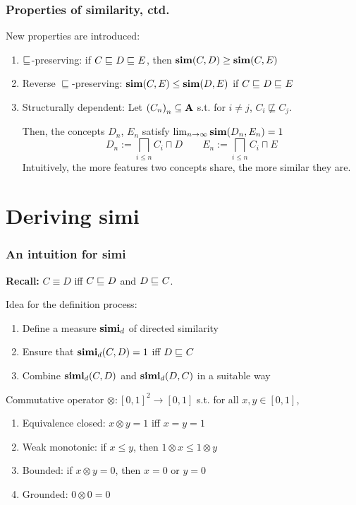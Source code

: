 \documentclass[smaller, dvipsnames]{beamer}
\newcounter{simprop}
\newcommand{\propplay}{\setcounter{enumi}{\thesimprop}}
\begin{document}
\begin{frame}
  \frametitle{Properties of similarity, ctd.}
  New properties are introduced:
  \begin{enumerate}[<+->]
    \propplay
    \item \alert{\(\sqsubseteq_{\mathcal{}}\)-preserving}: if \(C \sqsubseteq_{\mathcal{}} D \sqsubseteq_{\mathcal{}} E\),
    then \(\operatorname{\mathbf{sim}}(C,D) \ge \operatorname{\mathbf{sim}}(C,E)\)
    \item \alert{Reverse \(\sqsubseteq\)-preserving}: 
    \(\operatorname{\mathbf{sim}}(C,E) \le \operatorname{\mathbf{sim}}(D,E)\) if
    \(C \sqsubseteq_{\mathcal{}} D \sqsubseteq_{\mathcal{}} E\)
    \item \alert{Structurally dependent}: 
    Let \({(C_n)}_n \subseteq \mathbf{A}\) s.t. for \(i \ne j\),
    \(C_i \not\sqsubseteq C_j\).
    
    Then, the concepts
    \(D_n\), \(E_n\) satisfy
    \(\lim_{n \to \infty} \operatorname{\mathbf{sim}}(D_n,E_n) = 1\)
    \begin{equation*}
      D_n := \bigsqcap_{i \le n} C_i \sqcap D \qquad
      E_n := \bigsqcap_{i \le n} C_i \sqcap E
    \end{equation*}
    Intuitively, the more \alert{features}
    two concepts share, the more similar they are.
  \end{enumerate}
\end{frame}

\section{Deriving simi}

\begin{frame}
  \frametitle{An intuition for simi}
  \textbf{Recall:} \(C \equiv D\) iff \(C \sqsubseteq_{\mathcal{}} D\) and \(D \sqsubseteq_{\mathcal{}} C\).

  \onslide<+->  
  \alert{Idea} for the definition process:
  \begin{enumerate}[<+->]
    \item Define a measure \(\operatorname{\mathbf{simi}}_d\) of \alert{directed similarity}
    \item Ensure that \(\operatorname{\mathbf{simi}}_d(C,D) = 1\) iff \(D \sqsubseteq_{\mathcal{}} C\)
    \item Combine \(\operatorname{\mathbf{simi}}_d(C,D)\) and \(\operatorname{\mathbf{simi}}_d(D,C)\) in a suitable way
  \end{enumerate}
  \onslide<+->
  \begin{definition}
    Commutative operator
    \(\otimes \colon%
    {[0,1]}^2 \to [0,1]\) s.t. for all
    \(x, y \in [0,1]\),
    \begin{enumerate}%
      \item\label{fu:1} \alert{Equivalence closed}:
      \(x \otimes y = 1\) iff \(x = y = 1\)
      \item\label{fu:2} \alert{Weak monotonic}:
      if \(x \le y\), then
      \(1 \otimes x \le 1 \otimes y\) 
      \item\label{fu:3} \alert{Bounded}:
      if \(x \otimes y = 0\), then
      \(x = 0\) or \(y = 0\)
      \item\label{fu:4} \alert{Grounded}:
      \(0 \otimes 0 = 0\)
    \end{enumerate}
  \end{definition}
\end{frame}
\end{document}
